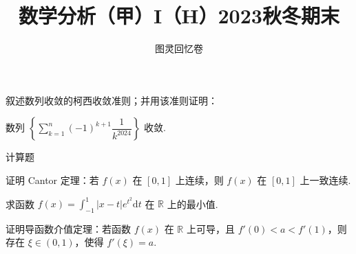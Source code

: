 \documentclass{exam}
\title{数学分析（甲）I（H）2023秋冬期末}
\author{图灵回忆卷}
\begin{document}
\maketitle

\begin{questions}
    \question[10]叙述数列收敛的柯西收敛准则；并用该准则证明：

    \begin{center}
        数列 \(\left\{\displaystyle\sum\limits_{k=1}^n(-1)^{k+1}\dfrac{1}{k^{2024}}\right\}\) 收敛.
    \end{center}

    \question[35]计算题


    \question[10]证明 Cantor 定理：若 \(f(x)\) 在 \([0,1]\) 上连续，则 \(f(x)\) 在 \([0,1]\) 上一致连续.

    \question[10]求函数 \(f(x)=\displaystyle\int_{-1}^{1}|x-t|e^{t^2}\mathrm{d}t\) 在 \(\mathbb{R}\) 上的最小值.

    \question[10]证明导函数介值定理：若函数 \(f(x)\) 在 \(\mathbb{R}\) 上可导，且 \(f'(0)<a<f'(1)\)，则存在 \(\xi\in(0,1)\)，使得 \(f'(\xi)=a\).


\end{questions}
\end{document}
